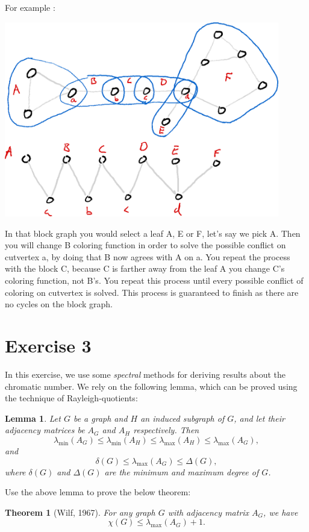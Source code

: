 \documentclass{article}
\newtheorem{lemma}{Lemma}
\newtheorem{theorem}{Theorem}
\begin{document}
For example :

      
      \includegraphics[width=0.9\textwidth]{graph_with_blockgraph.png}


In that block graph you would select a leaf A, E or F, let's say we pick A. Then you will change B coloring function in order to solve the possible conflict on cutvertex a, by doing that B now agrees with A on a. You repeat the process with the block C, because C is farther away from the leaf A you change C's coloring function, not B's. You repeat this process until every possible conflict of coloring on cutvertex is solved. This process is guaranteed to finish as there are no cycles on the block graph. 



\section*{Exercise 3}
 In this exercise, we use some \emph{spectral} methods for deriving results about the chromatic number. We rely on the following lemma, which can be proved using the technique of Rayleigh-quotients:

  \begin{lemma}
    Let $G$ be a graph and $H$ an induced subgraph of $G$, and let their adjacency matrices be $A_G$ and $A_H$ respectively. Then
    $$\lambda_{\min}\left(A_G\right) \leq \lambda_{\min}\left(A_H\right) \leq \lambda_{\max}\left(A_H\right) \leq \lambda_{\max}\left(A_G\right),$$
    and
    $$\delta(G) \leq \lambda_{\max}\left(A_G\right) \leq \Delta(G),$$
    where $\delta(G)$ and $\Delta(G)$ are the minimum and maximum degree of $G$.
  \end{lemma}

  Use the above lemma to prove the below theorem:
  \begin{theorem}[Wilf, 1967]
    For any graph $G$ with adjacency matrix $A_G$, we have
    $$\chi(G) \leq \lambda_{\max}\left(A_G\right) + 1.$$
  \end{theorem}
\end{document}
